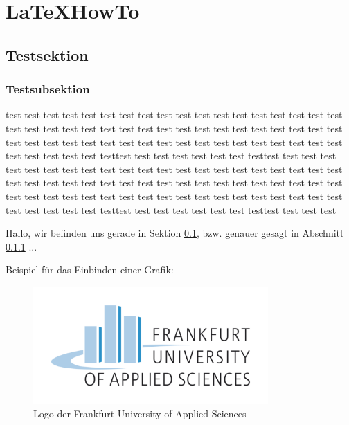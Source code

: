 \chapter*{\LaTeX HowTo}
\label{ch:LaTeXHowTo}

\section{Testsektion}
\label{sec:LateXHowTo_TestSektion}

\subsection{Testsubsektion}
\label{sec:LateXHowTo_Testsubsektion}

test test test test test test test test test test test test test test test test test test test test test test test test test test test test test test test test test test test test test test test test test test test test test test test test test test test test test test test test test test test testtest test test test test test test testtest test test test test test test test test test test test test test test test test test test test test test test test test test test test test test test test test test test test test test test test test test test test test test test test test test test test test test test test test test test test test test test testtest test test test test test test testtest test test test

Hallo, wir befinden uns gerade in Sektion \ref{sec:LateXHowTo_TestSektion}, bzw. genauer gesagt in 
Abschnitt \ref{sec:LateXHowTo_Testsubsektion} ...

Beispiel für das Einbinden einer Grafik:
\begin{figure}[htbp!]
 \centering
 \includegraphics[width=0.8\textwidth]{Figures/fra-uas_logo.pdf}
 \caption{Logo der Frankfurt University of Applied Sciences}
 \label{fig:Logo}
\end{figure}

